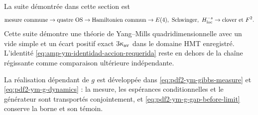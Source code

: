 La suite démontrée dans cette section est
\[
 \text{mesure commune}\to\text{quatre OS}\to\text{Hamiltonien commun}
 \to E(4),\ \text{Schwinger},\ H^{-s}_{\rm loc}
 \to\text{clover et }F^2.
\]
Cette suite démontre une théorie de Yang--Mills quadridimensionnelle avec un vide
simple et un écart positif exact \(3\kappa_{\rm av}\) dans le domaine HMT
enregistré. L’identité
\eqref{eq:amp-ym-identidad-accion-requerida} reste en dehors de la chaîne
régissante comme comparaison ultérieure indépendante.

La réalisation dépendant de \(g\) est développée dans
\eqref{eq:pdf2-ym-gibbs-measure} et
\eqref{eq:pdf2-ym-g-dynamics} : la mesure, les espérances
conditionnelles et le générateur sont transportés conjointement,
et \eqref{eq:pdf2-ym-g-gap-before-limit} conserve la borne et son témoin.
